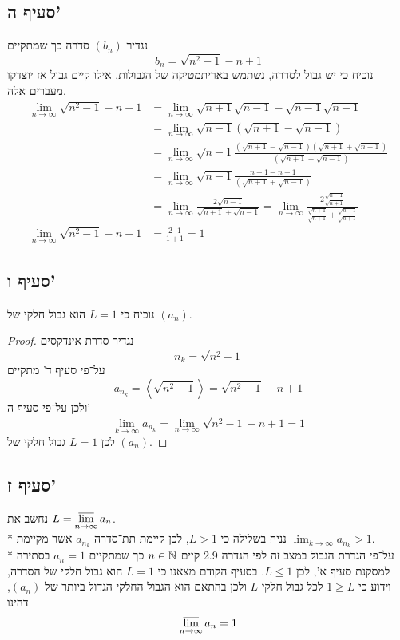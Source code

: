 \subsection{סעיף ה'}
נגדיר $(b_n)$ סדרה כך שמתקיים
\[
	b_n = \sqrt{n^2 - 1} - n + 1
\]
נוכיח כי יש גבול לסדרה, נשתמש באריתמטיקה של הגבולות, אילו קיים גבול אז יוצדקו מעברים אלה.
\begin{align*}
	\lim_{n \to \infty} \sqrt{n^2 - 1} - n + 1
	& = \lim_{n \to \infty}\sqrt{n + 1} \sqrt{n - 1} - \sqrt{n - 1} \sqrt{n - 1} \\
	& = \lim_{n \to \infty}\sqrt{n - 1} \left( \sqrt{n + 1} - \sqrt{n - 1} \right) \\
	& = \lim_{n \to \infty}\sqrt{n - 1} \frac{\left( \sqrt{n + 1} - \sqrt{n - 1} \right)\left( \sqrt{n + 1} + \sqrt{n - 1} \right)}
		{\left( \sqrt{n + 1} + \sqrt{n - 1} \right)} \\
	& = \lim_{n \to \infty}\sqrt{n - 1} \frac{n + 1 - n + 1}{\left( \sqrt{n + 1} + \sqrt{n - 1} \right)} \\
	& = \lim_{n \to \infty}\frac{2 \sqrt{n - 1}}{ \sqrt{n + 1} + \sqrt{n - 1} }
	= \lim_{n \to \infty}\frac{2 \frac{\sqrt{n - 1}}{\sqrt{n + 1}}}{ \frac{\sqrt{n + 1}}{\sqrt{n + 1}} + \frac{\sqrt{n - 1}}{\sqrt{n + 1}} } \\
	\lim_{n \to \infty} \sqrt{n^2 - 1} - n + 1
	& = \frac{2 \cdot 1}{1 + 1} = 1
\end{align*}

\subsection{סעיף ו'}
נוכיח כי $L = 1$ הוא גבול חלקי של $(a_n)$.
\begin{proof}
	נגדיר סדרת אינדקסים
	\[
		n_k = \sqrt{n^2 - 1}
	\]
	על־פי סעיף ד' מתקיים
	\[
		a_{n_k} = \left\langle \sqrt{n^2 - 1} \right\rangle = \sqrt{n^2 - 1} - n + 1
	\]
	ולכן על־פי סעיף ה'
	\[
		\lim_{k \to \infty} a_{n_k} = \lim_{n \to \infty} \sqrt{n^2 - 1} - n + 1 = 1
	\]
	לכן $L = 1$ גבול חלקי של $(a_n)$.
\end{proof}

\subsection{סעיף ז'}
נחשב את $L = \displaystyle\operatorname*{\overline{lim}}_{n \to \infty} a_n$. \\*
נניח בשלילה כי $L > 1$, לכן קיימת תת־סדרה $a_{n_k}$ אשר מקיימת $\lim_{k \to \infty} a_{n_k} > 1$. \\*
על־פי הגדרת הגבול במצב זה לפי הגדרה 2.9 קיים $n \in \mathbb{N}$ כך שמתקיים $a_n = 1$ בסתירה למסקנת סעיף א', לכן $L \le 1$.
בסעיף הקודם מצאנו כי $L = 1$ הוא גבול חלקי של הסדרה, וידוע כי $1 \ge L$ לכל גבול חלקי $L$ ולכן בהתאם הוא הגבול החלקי הגדול ביותר של $(a_n)$, דהינו
\[
	\displaystyle\operatorname*{\overline{lim}}_{n \to \infty} a_n = 1
\]

